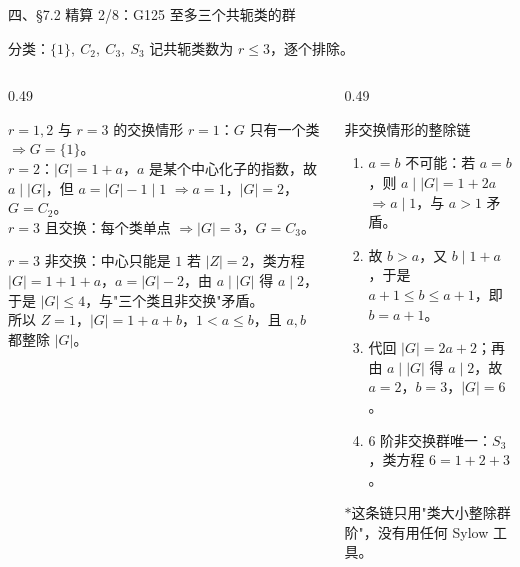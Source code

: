 \documentclass[aspectratio=169,10pt,fontset=none]{ctexbeamer}
\newcommand{\starpt}{\textcolor{accent}{\bfseries$\ast$}}
\begin{document}
\begin{frame}[t]{四、\S7.2 精算 2/8：G125 至多三个共轭类的群}
  \begin{block}{分类：$\{1\},\ C_2,\ C_3,\ S_3$}
    \small
    记共轭类数为 $r\le 3$，逐个排除。
  \end{block}
  \begin{columns}[T,onlytextwidth]
    \begin{column}{0.49\textwidth}
      \begin{exampleblock}{\footnotesize $r=1,2$ 与 $r=3$ 的交换情形}
        \scriptsize
        $r=1$：$G$ 只有一个类 $\Rightarrow G=\{1\}$。\\
        $r=2$：$|G|=1+a$，$a$ 是某个中心化子的指数，故 $a\mid|G|$，但 $a=|G|-1\mid1$ $\Rightarrow a=1$，$|G|=2$，$G=C_2$。\\
        $r=3$ 且交换：每个类单点 $\Rightarrow |G|=3$，$G=C_3$。
      \end{exampleblock}
      \begin{exampleblock}{\footnotesize $r=3$ 非交换：中心只能是 $1$}
        \scriptsize
        若 $|Z|=2$，类方程 $|G|=1+1+a$，$a=|G|-2$，由 $a\mid|G|$ 得 $a\mid2$，于是 $|G|\le4$，与"三个类且非交换"矛盾。\\
        所以 $Z=1$，$|G|=1+a+b$，$1<a\le b$，且 $a,b$ 都整除 $|G|$。
      \end{exampleblock}
    \end{column}
    \begin{column}{0.49\textwidth}
      \begin{alertblock}{\footnotesize 非交换情形的整除链}
        \scriptsize
        \begin{enumerate}\setlength{\itemsep}{2pt}
          \item $a=b$ 不可能：若 $a=b$，则 $a\mid|G|=1+2a$ $\Rightarrow a\mid1$，与 $a>1$ 矛盾。
          \item 故 $b>a$，又 $b\mid1+a$，于是 $a+1\le b\le a+1$，即 $b=a+1$。
          \item 代回 $|G|=2a+2$；再由 $a\mid|G|$ 得 $a\mid2$，故 $a=2$，$b=3$，$|G|=6$。
          \item 6 阶非交换群唯一：$S_3$，类方程 $6=1+2+3$。
        \end{enumerate}
        \starpt 这条链只用"类大小整除群阶"，没有用任何 Sylow 工具。
      \end{alertblock}
    \end{column}
  \end{columns}
\end{frame}
\end{document}
